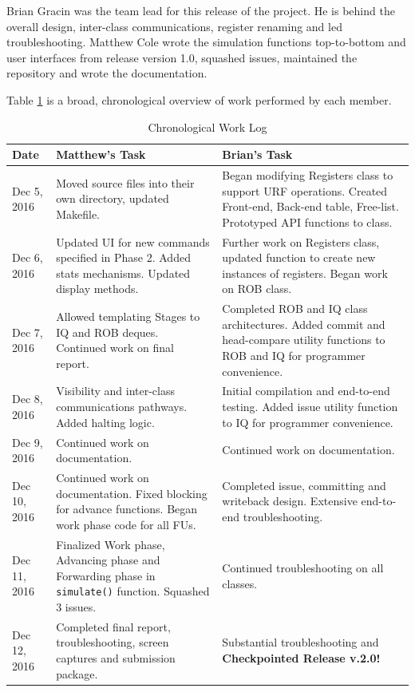 \documentclass[12pt]{article}
\begin{document}
Brian Gracin was the team lead for this release of the project. He is behind the overall design, inter-class communications, register renaming and led troubleshooting. 
Matthew Cole wrote the simulation functions top-to-bottom and user interfaces from release version 1.0, squashed issues, maintained the repository and wrote the documentation. 

Table \ref{tab:worklog} is a broad, chronological overview of work performed by each member. 

\begin{table}
\centering
\caption{Chronological Work Log}
\label{tab:worklog}
\begin{tabular}{l|p{2.75in}|p{2.75in}}
Date         	& Matthew's Task
				& Brian's Task \\
\hline
Dec 5, 2016  	& Moved source files into their own directory, updated Makefile.
				& Began modifying Registers class to support URF operations. Created Front-end, Back-end table, Free-list. Prototyped API functions to class. \\
Dec 6, 2016  	& Updated UI for new commands specified in Phase 2. Added stats mechanisms. Updated display methods.
				& Further work on Registers class, updated function to create new instances of registers. Began work on ROB class. \\
Dec 7, 2016		& Allowed templating Stages to IQ and ROB deques. Continued work on final report.
				& Completed ROB and IQ class architectures. Added commit and head-compare utility functions to ROB and IQ for programmer convenience. \\
Dec 8, 2016		& Visibility and inter-class communications pathways. Added halting logic.
				& Initial compilation and end-to-end testing. Added issue utility function to IQ for programmer convenience. \\
Dec 9, 2016		& Continued work on documentation.
				& Continued work on documentation.\\
Dec 10, 2016	& Continued work on documentation. Fixed blocking for advance functions. Began work phase code for all FUs.
				& Completed issue, committing and writeback design. Extensive end-to-end troubleshooting.\\
Dec 11, 2016	& Finalized Work phase, Advancing phase and Forwarding phase in \texttt{simulate()} function. Squashed 3 issues.
				& Continued troubleshooting on all classes.\\
Dec 12, 2016	& Completed final report, troubleshooting, screen captures and submission package.
				& Substantial troubleshooting and \textbf{Checkpointed Release v.2.0!}\\
\end{tabular}
\end{table}
\end{document}

